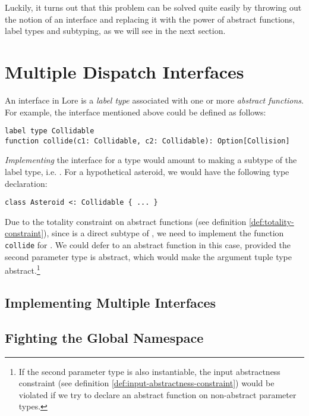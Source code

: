 Luckily, it turns out that this problem can be solved quite easily by throwing out the notion of an interface and replacing it with the power of abstract functions, label types and subtyping, as we will see in the next section.



\section{Multiple Dispatch Interfaces}

An interface in Lore is a \textit{label type} associated with one or more \textit{abstract functions}. For example, the  interface mentioned above could be defined as follows:

\begin{lstlisting}
label type Collidable
function collide(c1: Collidable, c2: Collidable): Option[Collision]
\end{lstlisting}

\noindent \textit{Implementing} the interface for a type  would amount to making  a subtype of the label type, i.e. . For a hypothetical asteroid, we would have the following type declaration:

\begin{lstlisting}
class Asteroid <: Collidable { ... }
\end{lstlisting}

\noindent Due to the totality constraint on abstract functions (see definition \ref{def:totality-constraint}), since  is a direct subtype of , we need to implement the function \texttt{collide} for . We could defer to an abstract function in this case, provided the second parameter type is abstract, which would make the argument tuple type abstract.\footnote{If the second parameter type is also instantiable, the input abstractness constraint (see definition \ref{def:input-abstractness-constraint}) would be violated if we try to declare an abstract function on non-abstract parameter types.}


\subsection{Implementing Multiple Interfaces}


\subsection{Fighting the Global Namespace}



